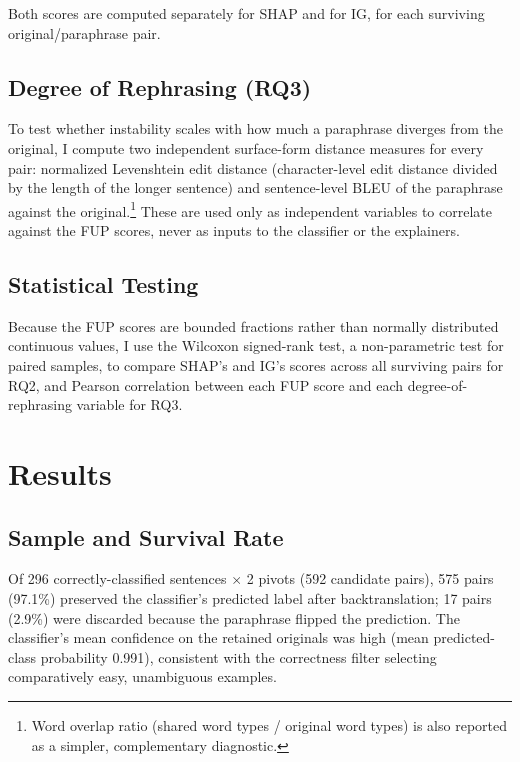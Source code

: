 Both scores are computed separately for SHAP and for IG, for each
surviving original/paraphrase pair.

\subsection{Degree of Rephrasing (RQ3)}

To test whether instability scales with how much a paraphrase diverges
from the original, I compute two independent surface-form distance
measures for every pair: normalized Levenshtein edit distance
(character-level edit distance divided by the length of the longer
sentence) and sentence-level BLEU of the paraphrase against the
original.\footnote{Word overlap ratio (shared word types / original word
types) is also reported as a simpler, complementary diagnostic.} These
are used only as independent variables to correlate against the FUP
scores, never as inputs to the classifier or the explainers.

\subsection{Statistical Testing}

Because the FUP scores are bounded fractions rather than normally
distributed continuous values, I use the Wilcoxon signed-rank test, a
non-parametric test for paired samples, to compare SHAP's and IG's
scores across all surviving pairs for RQ2, and Pearson correlation
between each FUP score and each degree-of-rephrasing variable for RQ3.

\section{Results}
\label{sec:results}

\subsection{Sample and Survival Rate}

Of 296 correctly-classified sentences $\times$ 2 pivots (592 candidate
pairs), 575 pairs (97.1\%) preserved the classifier's predicted label
after backtranslation; 17 pairs (2.9\%) were discarded because the
paraphrase flipped the prediction. The classifier's mean confidence on
the retained originals was high (mean predicted-class probability
0.991), consistent with the correctness filter selecting comparatively
easy, unambiguous examples.

